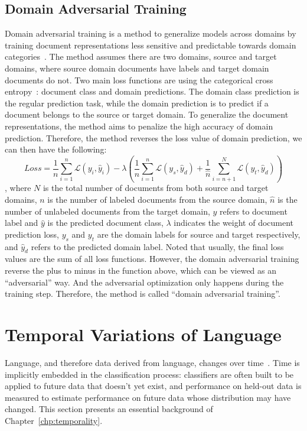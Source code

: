 
\subsection{Domain Adversarial Training}

Domain adversarial training is a method to generalize models across domains by training document representations less sensitive and predictable towards domain categories~\cite{ganin2016domain}.
The method assumes there are two domains, source and target domains, where source domain documents have labels and target domain documents do not.
Two main loss functions are using the categorical cross entropy~\cite{goodfellow2016deep}: document class and domain predictions.
The domain class prediction is the regular prediction task, while the domain prediction is to predict if a document belongs to the source or target domain.
To generalize the document representations, the method aims to penalize the high accuracy of domain prediction.
Therefore, the method reverses the loss value of domain prediction, we can then have the following:
$$Loss = \frac{1}{n}\sum_{i=1}^n\mathcal{L}(y_i, \hat{y}_i) - \lambda(\frac{1}{n}\sum_{i=1}^n\mathcal{L}(y_s, \hat{y}_d) + \frac{1}{\hat{n}}\sum_{i=n+1}^N\mathcal{L}(y_t, \hat{y}_d))$$
, where $N$ is the total number of documents from both source and target domains, $n$ is the number of labeled documents from the source domain, $\hat{n}$ is the number of unlabeled documents from the target domain, $y$ refers to document label and $\hat{y}$ is the predicted document class, $\lambda$ indicates the weight of document prediction loss, $y_s$ and $y_t$ are the domain labels for source and target respectively, and $\hat{y}_d$ refers to the predicted domain label.
Noted that usually, the final loss values are the sum of all loss functions.
However, the domain adversarial training reverse the plus to minus in the function above, which can be viewed as an ``adversarial'' way.
And the adversarial optimization only happens during the training step.
Therefore, the method is called ``domain adversarial training''. 


\section{Temporal Variations of Language}
\label{chap2:sec:time}

Language, and therefore data derived from language, changes over time~\cite{ullmann1963modern}.
Time is implicitly embedded in the classification process: classifiers are often built to be applied to future data that doesn't yet exist, and performance on held-out data is measured to estimate performance on future data whose distribution may have changed.
This section presents an essential background of Chapter~\ref{chp:temporality}.


